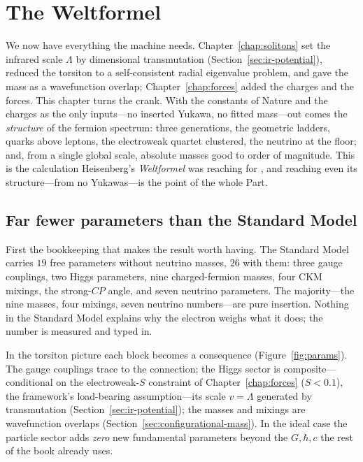 \chapter{The Weltformel}
\label{chap:weltformel}

We now have everything the machine needs. Chapter~\ref{chap:solitons} set the infrared scale
$\Lambda$ by dimensional transmutation (Section~\ref{sec:ir-potential}), reduced the torsiton to
a self-consistent radial eigenvalue problem, and gave the mass as a wavefunction overlap;
Chapter~\ref{chap:forces} added the charges and the forces. This chapter turns the crank. With
the constants of Nature and the charges as the only inputs---no inserted Yukawa, no fitted
mass---out comes the \emph{structure} of the fermion spectrum: three generations, the geometric
ladders, quarks above leptons, the electroweak quartet clustered, the neutrino at the floor; and,
from a single global scale, absolute masses good to order of magnitude. This is the calculation
Heisenberg's \emph{Weltformel} was reaching for \citep{heisenberg1957}, and reaching even its
structure---from no Yukawas---is the point of the whole Part.

\section{Far fewer parameters than the Standard Model}
\label{sec:params}

First the bookkeeping that makes the result worth having. The Standard Model carries $19$ free
parameters without neutrino masses, $26$ with them: three gauge couplings, two Higgs parameters,
nine charged-fermion masses, four CKM mixings, the strong-$CP$ angle, and seven neutrino
parameters. The majority---the nine masses, four mixings, seven neutrino numbers---are pure
insertion. Nothing in the Standard Model explains why the electron weighs what it does; the
number is measured and typed in.

In the torsiton picture each block becomes a consequence (Figure~\ref{fig:params}). The gauge
couplings trace to the connection; the Higgs sector is composite---conditional on the
electroweak-$S$ constraint of Chapter~\ref{chap:forces} ($S<0.1$), the framework's load-bearing
assumption---its scale $v=\Lambda$ generated by transmutation (Section~\ref{sec:ir-potential}); the
masses and mixings are wavefunction overlaps (Section~\ref{sec:configurational-mass}). In the ideal case the particle sector adds
\emph{zero} new fundamental parameters beyond the $G,\hbar,c$ the rest of the book already uses.

